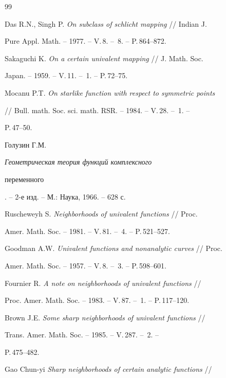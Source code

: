  


\begin{thebibliography}{99} 


 




Das R.N., Singh P. {\em On subclass of schlicht mapping} // Indian J. 


Pure Appl. Math. -- 1977. -- V.\,8. -- \No\,8. -- P.\,864--872. 




Sakaguchi K. {\em On a certain univalent mapping} // J. Math. Soc. 


Japan. -- 1959. -- V.\,11. -- \No\,1. -- P.\,72--75. 




Mocanu P.T. {\em On starlike function with respect to symmetric points} 


// Bull. math. Soc. sci. math. RSR. -- 1984. -- V.\,28. -- \No\,1. -- 


P.\,47--50. 




Голузин Г.М. {\em Геометрическая теория функций комплексного 


переменного}. -- 2-е изд. -- М.: Наука, 1966. -- 628 с. 




Ruscheweyh S. {\em Neighborhoods of univalent functions} // Proc. 


Amer. Math. Soc. -- 1981. -- V.\,81. -- \No\,4. -- P.\,521--527. 




Goodman A.W. {\em Univalent functions and nonanalytic curves} // Proc. 


Amer. Math. Soc. -- 1957. -- V.\,8. -- \No\,3. -- P.\,598--601. 




Fournier R. {\em  A note on neighborhoods of univalent functions} // 


Proc. Amer. Math. Soc. -- 1983. -- V.\,87. -- \No\,1. -- P.\,117--120. 




Brown J.E. {\em Some sharp neighborhoods of univalent functions} // 


Trans. Amer. Math. Soc. -- 1985. -- V.\,287. -- \No\,2. -- 


P.\,475--482. 




Gao Chun-yi {\em Sharp neighborhoods of certain analytic functions} // 



\end{thebibliography}
